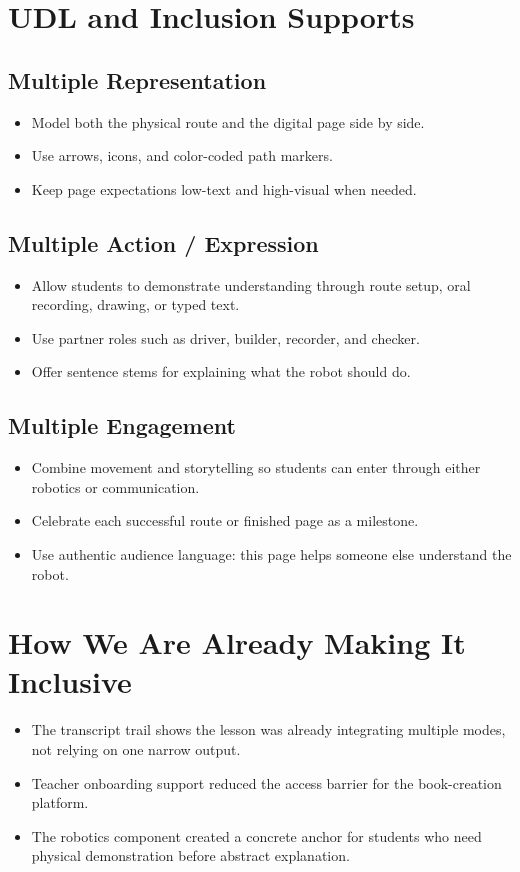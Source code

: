 \documentclass[11pt]{article}
\begin{document}
\section*{UDL and Inclusion Supports}
\subsection*{Multiple Representation}
\begin{itemize}[leftmargin=*]
\item Model both the physical route and the digital page side by side.
\item Use arrows, icons, and color-coded path markers.
\item Keep page expectations low-text and high-visual when needed.
\end{itemize}

\subsection*{Multiple Action / Expression}
\begin{itemize}[leftmargin=*]
\item Allow students to demonstrate understanding through route setup, oral recording, drawing, or typed text.
\item Use partner roles such as driver, builder, recorder, and checker.
\item Offer sentence stems for explaining what the robot should do.
\end{itemize}

\subsection*{Multiple Engagement}
\begin{itemize}[leftmargin=*]
\item Combine movement and storytelling so students can enter through either robotics or communication.
\item Celebrate each successful route or finished page as a milestone.
\item Use authentic audience language: this page helps someone else understand the robot.
\end{itemize}

\section*{How We Are Already Making It Inclusive}
\begin{itemize}[leftmargin=*]
\item The transcript trail shows the lesson was already integrating multiple modes, not relying on one narrow output.
\item Teacher onboarding support reduced the access barrier for the book-creation platform.
\item The robotics component created a concrete anchor for students who need physical demonstration before abstract explanation.
\end{itemize}
\end{document}
